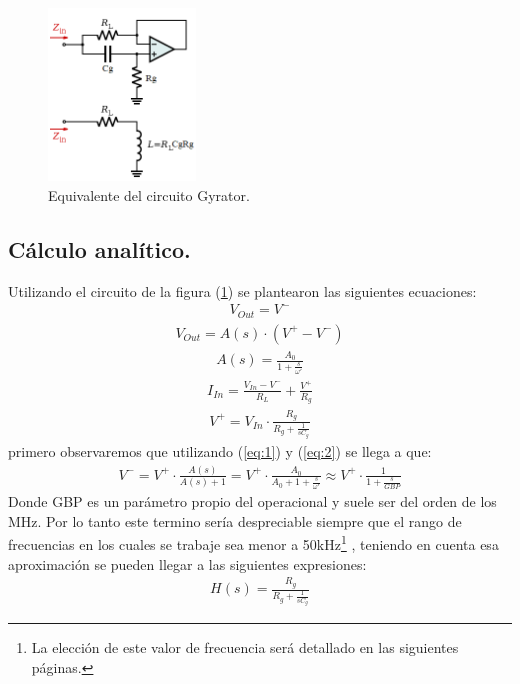 \begin{figure}[H]	
	\centering
	\includegraphics[width=0.35\textwidth]{ImagenesEj2/gyrop.png}
	\caption{Equivalente del circuito Gyrator.}
	\label{fig:gyrop}
\end{figure}

\subsection{Cálculo analítico.}
Utilizando el circuito de la figura (\ref{fig:gyrop}) se plantearon las siguientes ecuaciones:
\begin{align}   V_{Out} = V^- \label{eq:1}\end{align}
\begin{align} V_{Out} = A(s) \cdot (V^+-V^-)\label{eq:2}\end{align}
\begin{align} A(s)= \frac{A_0}{1+\frac{s}{\omega'}}\end{align}
\begin{align} I_{In}=\frac{V_{In}-V^-}{R_L}+\frac{V^+}{R_g}\end{align}
\begin{align} V^+=V_{In}\cdot \frac{R_g}{R_g+\frac{1}{sC_g}} \end{align}
primero observaremos que utilizando (\ref{eq:1}) y (\ref{eq:2}) se llega a que:
\begin{align}V^- =V^+ \cdot \frac{A(s)}{A(s)+1} = V^+ \cdot \frac{A_0}{A_0+1+\frac{s}{\omega'}} \approx V^+ \cdot \frac{1}{1+\frac{s}{GBP}} \label{eq:desp}   \end{align}
Donde GBP es un parámetro propio del operacional y suele ser del orden de los MHz. Por lo tanto este termino sería despreciable siempre que el rango de frecuencias en los cuales se trabaje sea menor a 50kHz\footnote{La elección de este valor de frecuencia será detallado en las siguientes páginas.}
, teniendo en cuenta esa aproximación se pueden llegar a las siguientes expresiones:
\begin{align}H(s)= \frac{R_g}{R_g+\frac{1}{sC_g}} \end{align}


